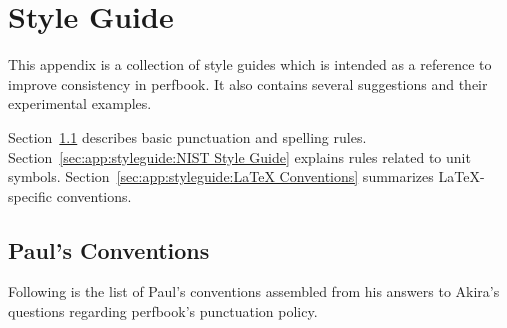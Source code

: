 
\chapter{Style Guide}
\label{chp:app:styleguide:Style Guide}
%

This appendix is a collection of style guides which is intended
as a reference to improve consistency in perfbook. It also contains
several suggestions and their experimental examples.

Section~\ref{sec:app:styleguide:Paul's Conventions} describes basic
punctuation and spelling rules.
Section~\ref{sec:app:styleguide:NIST Style Guide} explains rules
related to unit symbols.
Section~\ref{sec:app:styleguide:LaTeX Conventions} summarizes
\LaTeX-specific conventions.

\section{Paul's Conventions}
\label{sec:app:styleguide:Paul's Conventions}

Following is the list of Paul's conventions assembled from his
answers to Akira's questions regarding perfbook's punctuation policy.

